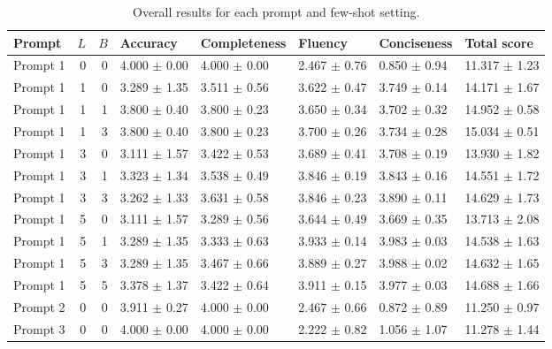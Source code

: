 \begin{table}
\caption{Overall results for each prompt and few-shot setting.}
\begin{tabular}{lrrlllll}
\toprule
Prompt & $L$ & $B$ & Accuracy & Completeness & Fluency & Conciseness & Total score \\
\midrule
Prompt 1 & 0 & 0 & 4.000 $\pm$ 0.00 & 4.000 $\pm$ 0.00 & 2.467 $\pm$ 0.76 & 0.850 $\pm$ 0.94 & 11.317 $\pm$ 1.23 \\
Prompt 1 & 1 & 0 & 3.289 $\pm$ 1.35 & 3.511 $\pm$ 0.56 & 3.622 $\pm$ 0.47 & 3.749 $\pm$ 0.14 & 14.171 $\pm$ 1.67 \\
Prompt 1 & 1 & 1 & 3.800 $\pm$ 0.40 & 3.800 $\pm$ 0.23 & 3.650 $\pm$ 0.34 & 3.702 $\pm$ 0.32 & 14.952 $\pm$ 0.58 \\
Prompt 1 & 1 & 3 & 3.800 $\pm$ 0.40 & 3.800 $\pm$ 0.23 & 3.700 $\pm$ 0.26 & 3.734 $\pm$ 0.28 & 15.034 $\pm$ 0.51 \\
Prompt 1 & 3 & 0 & 3.111 $\pm$ 1.57 & 3.422 $\pm$ 0.53 & 3.689 $\pm$ 0.41 & 3.708 $\pm$ 0.19 & 13.930 $\pm$ 1.82 \\
Prompt 1 & 3 & 1 & 3.323 $\pm$ 1.34 & 3.538 $\pm$ 0.49 & 3.846 $\pm$ 0.19 & 3.843 $\pm$ 0.16 & 14.551 $\pm$ 1.72 \\
Prompt 1 & 3 & 3 & 3.262 $\pm$ 1.33 & 3.631 $\pm$ 0.58 & 3.846 $\pm$ 0.23 & 3.890 $\pm$ 0.11 & 14.629 $\pm$ 1.73 \\
Prompt 1 & 5 & 0 & 3.111 $\pm$ 1.57 & 3.289 $\pm$ 0.56 & 3.644 $\pm$ 0.49 & 3.669 $\pm$ 0.35 & 13.713 $\pm$ 2.08 \\
Prompt 1 & 5 & 1 & 3.289 $\pm$ 1.35 & 3.333 $\pm$ 0.63 & 3.933 $\pm$ 0.14 & 3.983 $\pm$ 0.03 & 14.538 $\pm$ 1.63 \\
Prompt 1 & 5 & 3 & 3.289 $\pm$ 1.35 & 3.467 $\pm$ 0.66 & 3.889 $\pm$ 0.27 & 3.988 $\pm$ 0.02 & 14.632 $\pm$ 1.65 \\
Prompt 1 & 5 & 5 & 3.378 $\pm$ 1.37 & 3.422 $\pm$ 0.64 & 3.911 $\pm$ 0.15 & 3.977 $\pm$ 0.03 & 14.688 $\pm$ 1.66 \\
Prompt 2 & 0 & 0 & 3.911 $\pm$ 0.27 & 4.000 $\pm$ 0.00 & 2.467 $\pm$ 0.66 & 0.872 $\pm$ 0.89 & 11.250 $\pm$ 0.97 \\
Prompt 3 & 0 & 0 & 4.000 $\pm$ 0.00 & 4.000 $\pm$ 0.00 & 2.222 $\pm$ 0.82 & 1.056 $\pm$ 1.07 & 11.278 $\pm$ 1.44 \\
\bottomrule
\end{tabular}
\end{table}
